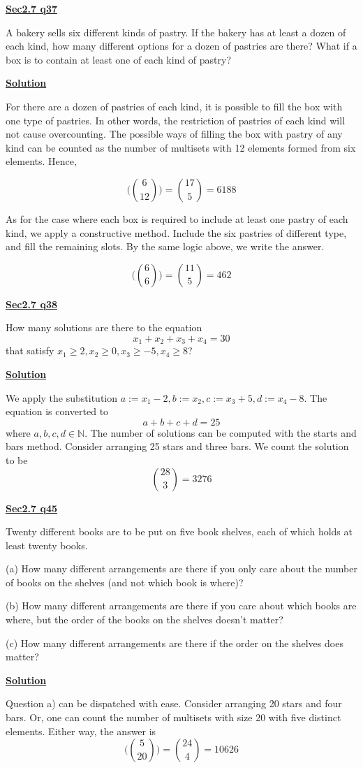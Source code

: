 \documentclass{article}
\newcommand{\new}[1]{
    \vspace{2mm}
    \noindent
    \textbf{
    \underline{#1}}
}
\newcommand{\bbinom}[2]{
    \bigg(\binom{#1}{#2}\bigg)
}
\begin{document}
\new{Sec2.7 q37}
A bakery sells six different kinds of pastry. If the bakery has at least a dozen of 
each kind, how many different options for a dozen of pastries are there? What 
if a box is to contain at least one of each kind of pastry?

\new{Solution}
For there are a dozen of pastries of each kind, it is possible to fill the 
box with one type of pastries. In other words, the restriction of pastries of 
each kind will not cause overcounting. The possible ways of filling the box 
with pastry of any kind can be counted as the number of multisets with 12 
elements formed from six elements. Hence,

\[
    \bbinom{6}{12} = \binom{17}{5} = \boxed{6188}
\]

As for the case where each box is required to include at least 
one pastry of each kind, we apply a constructive method. Include the 
six pastries of different type, and fill the remaining slots. By the 
same logic above, we write the answer.

\[
\bbinom{6}{6} = \binom{11}{5} = \boxed{462}
\]

\new{Sec2.7 q38}
How many solutions are there to the equation
\[
    x_1+x_2+x_3+x_4 = 30
\]
that satisfy $x_1\geq2, x_2\geq0, x_3 \geq-5, x_4 \geq8$?

\new{Solution}
We apply the substitution $a := x_1-2, b:=x_2, c:=x_3 +5, d:=x_4 - 8$. 
The equation is converted to
\[
    a + b + c + d = 25
\]
where $a, b, c, d \in \mathbb{N}$. The number of solutions can 
be computed with the starts and bars method. Consider arranging 
25 stars and three bars. We count the solution to be
\[
    \binom{28}{3} = \boxed{3276}
\]

\new{Sec2.7 q45}
Twenty different books are to be put on five book shelves, each of which holds 
at least twenty books. 

(a) How many different arrangements are there if you only care about the 
number of books on the shelves (and not which book is where)? 

(b) How many different arrangements are there if you care about which books 
are where, but the order of the books on the shelves doesn't matter?

(c) How many different arrangements are there if the order on the shelves does 
matter?


\new{Solution}
Question a) can be dispatched with ease. Consider arranging 20 stars and four bars. 
Or, one can count the number of multisets with size 20 with five distinct elements. 
Either way, the answer is
\[
    \bbinom{5}{20} = \binom{24}{4} = \boxed{10626}
\]
\end{document}
